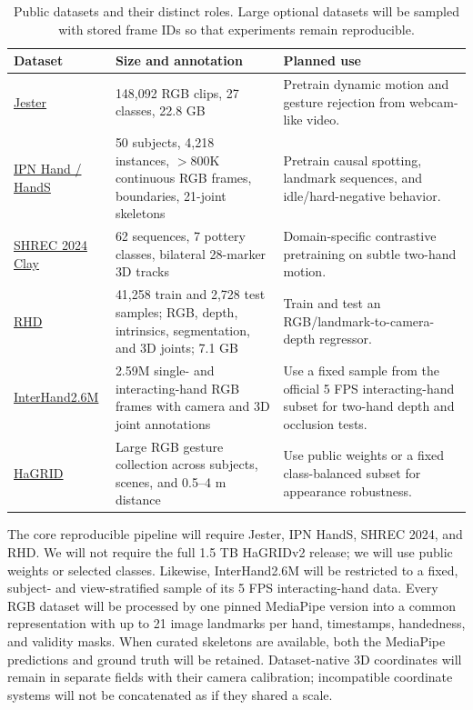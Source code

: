 \documentclass{article}
\begin{document}
\begin{table}[h]
\centering
\footnotesize
\setlength{\tabcolsep}{4pt}
\begin{tabularx}{\textwidth}{@{}p{}p{}X@{}}
\toprule
Dataset & Size and annotation & Planned use \\
\midrule
\href{https://www.qualcomm.com/developer/software/jester-dataset}{Jester} & 148,092 RGB clips, 27 classes, 22.8 GB & Pretrain dynamic motion and gesture rejection from webcam-like video. \\
\href{https://gibranbenitez.github.io/IPN_Hand/}{IPN Hand / HandS} & 50 subjects, 4,218 instances, $>$800K continuous RGB frames, boundaries, 21-joint skeletons & Pretrain causal spotting, landmark sequences, and idle/hard-negative behavior. \\
\href{https://github.com/o-ikne/skelmae-shrec24}{SHREC 2024 Clay} & 62 sequences, 7 pottery classes, bilateral 28-marker 3D tracks & Domain-specific contrastive pretraining on subtle two-hand motion. \\
\href{https://lmb.informatik.uni-freiburg.de/resources/datasets/RenderedHandposeDataset.en.html}{RHD} & 41,258 train and 2,728 test samples; RGB, depth, intrinsics, segmentation, and 3D joints; 7.1 GB & Train and test an RGB/landmark-to-camera-depth regressor. \\
\href{https://mks0601.github.io/InterHand2.6M/}{InterHand2.6M} & 2.59M single- and interacting-hand RGB frames with camera and 3D joint annotations & Use a fixed sample from the official 5 FPS interacting-hand subset for two-hand depth and occlusion tests. \\
\href{https://github.com/hukenovs/hagrid}{HaGRID} & Large RGB gesture collection across subjects, scenes, and 0.5--4 m distance & Use public weights or a fixed class-balanced subset for appearance robustness. \\
\bottomrule
\end{tabularx}
\caption{Public datasets and their distinct roles. Large optional datasets will
be sampled with stored frame IDs so that experiments remain reproducible.}
\label{tab:data}
\end{table}

The core reproducible pipeline will require Jester, IPN HandS, SHREC 2024, and
RHD. We will not require the full 1.5 TB HaGRIDv2 release; we will use public
weights or selected classes. Likewise, InterHand2.6M will be restricted to a
fixed, subject- and view-stratified sample of its 5 FPS interacting-hand data.
Every RGB dataset will be processed by one pinned MediaPipe version
\citep{zhang2020mediapipe} into a
common representation with up to 21 image landmarks per hand, timestamps,
handedness, and validity masks. When curated skeletons are available, both the
MediaPipe predictions and ground truth will be retained. Dataset-native 3D
coordinates will remain in separate fields with their camera calibration;
incompatible coordinate systems will not be concatenated as if they shared a
scale.
\end{document}
